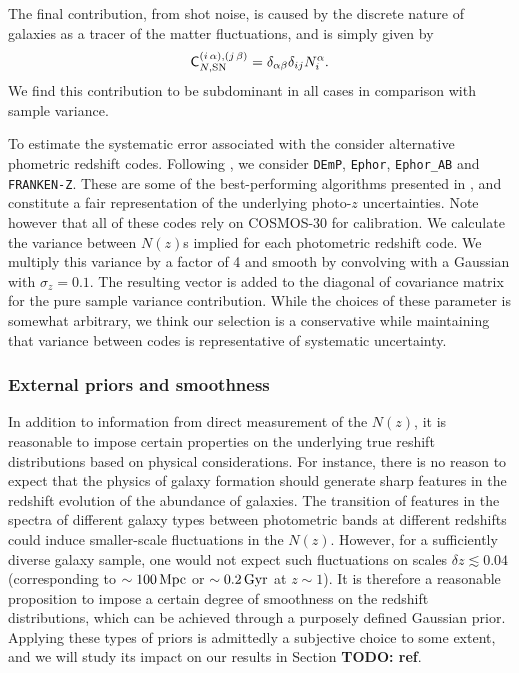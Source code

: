 \documentclass[a4paper,11pt]{article}
\newcommand{\todo}[1]{{\bf TODO: #1}}
\begin{document}
        The final contribution, from shot noise, is caused by the discrete nature of galaxies as a tracer of the matter fluctuations, and is simply given by
        \begin{equation}
          {\sf C}^{(i\,\alpha),(j\,\beta)}_{N,{\rm SN}}=\delta_{\alpha\beta}\delta_{ij}N^\alpha_i.
        \end{equation}
We find this contribution to be subdominant in all cases in comparison with sample variance.


To estimate the systematic error associated with the consider alternative phometric redshift codes. Following \cite{1912.08209}, we consider  {\tt DEmP}, {\tt Ephor}, {\tt Ephor\_AB} and {\tt FRANKEN-Z}. These are some of the best-performing algorithms presented in \cite{2018PASJ...70S...9T}, and constitute a fair representation of the underlying photo-$z$ uncertainties. Note however that all of these codes rely on COSMOS-30 for calibration. We calculate the variance between $N(z)$s implied for each photometric redshift code. We multiply this variance by a factor of 4 and smooth by convolving with a Gaussian with $\sigma_z=0.1$. The resulting vector is added to the diagonal of covariance matrix for the pure sample variance contribution. While the choices of these parameter is somewhat arbitrary, we think our selection is a conservative while maintaining that variance between codes is representative of systematic uncertainty.

    \subsubsection{External priors and smoothness}\label{sssec:theory.prior.smooth}
      In addition to information from direct measurement of the $N(z)$, it is reasonable to impose certain properties on the underlying true reshift distributions based on physical considerations. For instance, there is no reason to expect that the physics of galaxy formation should generate sharp features in the redshift evolution of the abundance of galaxies. The transition of features in the spectra of different galaxy types between photometric bands at different redshifts could induce smaller-scale fluctuations in the $N(z)$. However, for a sufficiently diverse galaxy sample, one would not expect such fluctuations on scales $\delta z\lesssim0.04$ (corresponding to $\sim100\,{\rm Mpc}$ or $\sim0.2\,{\rm Gyr}$ at $z\sim1$). It is therefore a reasonable proposition to impose a certain degree of smoothness on the redshift distributions, which can be achieved through a purposely defined Gaussian prior. Applying these types of priors is admittedly a subjective choice to some extent, and we will study its impact on our results in Section \todo{ref}.
      
\end{document}
